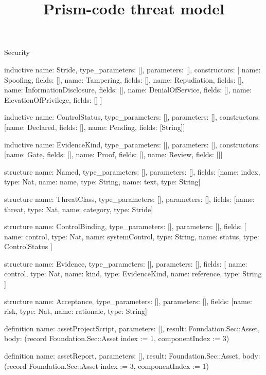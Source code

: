 \begin{lexlean}{Security}
\title{Prism-code threat model}
\begin{semanticmodule}
inductive{
  name: Stride,
  type_parameters: [],
  parameters: [],
  constructors: [
    {name: Spoofing, fields: []},
    {name: Tampering, fields: []},
    {name: Repudiation, fields: []},
    {name: InformationDisclosure, fields: []},
    {name: DenialOfService, fields: []},
    {name: ElevationOfPrivilege, fields: []}
  ]
}

inductive{
  name: ControlStatus,
  type_parameters: [],
  parameters: [],
  constructors: [{name: Declared, fields: []}, {name: Pending, fields: [String]}]
}

inductive{
  name: EvidenceKind,
  type_parameters: [],
  parameters: [],
  constructors: [{name: Gate, fields: []}, {name: Proof, fields: []}, {name: Review, fields: []}]
}

structure{
  name: Named,
  type_parameters: [],
  parameters: [],
  fields: [{name: index, type: Nat}, {name: name, type: String}, {name: text, type: String}]
}

structure{
  name: ThreatClass,
  type_parameters: [],
  parameters: [],
  fields: [{name: threat, type: Nat}, {name: category, type: Stride}]
}

structure{
  name: ControlBinding,
  type_parameters: [],
  parameters: [],
  fields: [
    {name: control, type: Nat},
    {name: systemControl, type: String},
    {name: status, type: ControlStatus}
  ]
}

structure{
  name: Evidence,
  type_parameters: [],
  parameters: [],
  fields: [
    {name: control, type: Nat},
    {name: kind, type: EvidenceKind},
    {name: reference, type: String}
  ]
}

structure{
  name: Acceptance,
  type_parameters: [],
  parameters: [],
  fields: [{name: risk, type: Nat}, {name: rationale, type: String}]
}

definition{
  name: assetProjectScript,
  parameters: [],
  result: Foundation.Sec::Asset,
  body: (record Foundation.Sec::Asset {index := 1, componentIndex := 3})
}

definition{
  name: assetReport,
  parameters: [],
  result: Foundation.Sec::Asset,
  body: (record Foundation.Sec::Asset {index := 3, componentIndex := 1})
}


\end{semanticmodule}
\end{lexlean}
